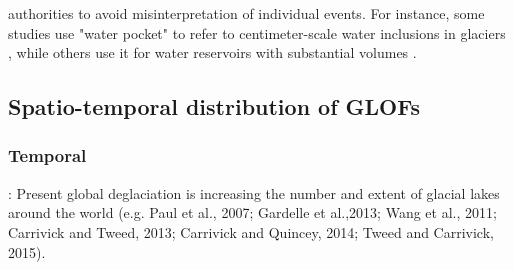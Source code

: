 authorities to avoid misinterpretation of individual events. For instance, some studies use "water pocket" to refer to centimeter-scale water inclusions in glaciers \citep[e.g.][]{Vivian&Bocquet1973,Raymond&Harrison1975,Holmlund1988,Fountain&Walder1998,Murray&al2000b}, while others use it for water reservoirs with substantial volumes \citep[][]{Beecroft1983, Haeberli&al1989,Tweed&Russel1999,Vincent&al2010b}. 








\subsection{Spatio-temporal distribution of GLOFs}

\subsubsection{Temporal} %



\cite{Carrivick&Tweed2016}: Present global deglaciation is increasing the number and extent of glacial lakes around the world (e.g. Paul et al., 2007; Gardelle et al.,2013; Wang et al., 2011; Carrivick and Tweed, 2013; Carrivick and Quincey, 2014; Tweed and Carrivick, 2015).

